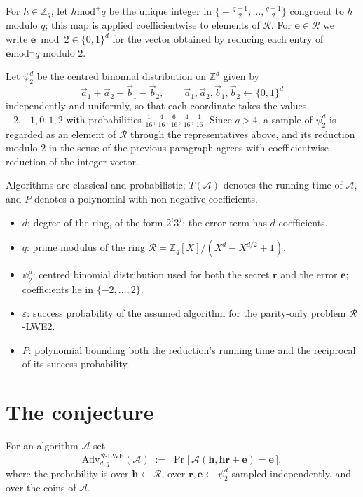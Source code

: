 \documentclass{aicr-conjecture}
\newcommand{\modpm}{\mathbin{\mathrm{mod}^{\pm}}}
\newcommand{\advlwe}{\mathrm{Adv}^{\mathcal{R}\text{-}\mathrm{LWE}}_{d,q}}
\begin{document}
For $h \in \mathbb{Z}_q$, let $h \modpm q$ be the unique integer in
$\bigl\{-\tfrac{q-1}{2},\dots,\tfrac{q-1}{2}\bigr\}$ congruent to $h$
modulo $q$; this map is applied coefficientwise to elements of
$\mathcal{R}$. For $\mathbf{e} \in \mathcal{R}$ we write
$\mathbf{e} \bmod 2 \in \{0,1\}^{d}$ for the vector obtained by
reducing each entry of $\mathbf{e} \modpm q$ modulo $2$.

Let $\psi_2^{d}$ be the centred binomial distribution on
$\mathbb{Z}^{d}$ given by
\[
  \vec{a}_1 + \vec{a}_2 - \vec{b}_1 - \vec{b}_2, \qquad
  \vec{a}_1,\vec{a}_2,\vec{b}_1,\vec{b}_2 \leftarrow \{0,1\}^{d}
\]
independently and uniformly, so that each coordinate takes the values
$-2,-1,0,1,2$ with probabilities
$\tfrac{1}{16},\tfrac{4}{16},\tfrac{6}{16},\tfrac{4}{16},\tfrac{1}{16}$.
Since $q > 4$, a sample of $\psi_2^{d}$ is regarded as an element of
$\mathcal{R}$ through the representatives above, and its reduction
modulo $2$ in the sense of the previous paragraph agrees with
coefficientwise reduction of the integer vector.

Algorithms are classical and probabilistic; $T(\mathcal{A})$ denotes
the running time of $\mathcal{A}$, and $P$ denotes a polynomial with
non-negative coefficients.

\begin{itemize}
\item $d$: degree of the ring, of the form $2^{i}3^{j}$; the error term
  has $d$ coefficients.
\item $q$: prime modulus of the ring
  $\mathcal{R} = \mathbb{Z}_q[X]/(X^{d}-X^{d/2}+1)$.
\item $\psi_2^{d}$: centred binomial distribution used for both the
  secret $\mathbf{r}$ and the error $\mathbf{e}$; coefficients lie in
  $\{-2,\dots,2\}$.
\item $\varepsilon$: success probability of the assumed algorithm for
  the parity-only problem $\mathcal{R}$-LWE2.
\item $P$: polynomial bounding both the reduction's running time and
  the reciprocal of its success probability.
\end{itemize}

\section{The conjecture}\label{sec:conjectures}

\begin{definition}\label{def:rlwe}
For an algorithm $\mathcal{A}$ set
\[
  \advlwe(\mathcal{A})
  \;:=\;
  \Pr\bigl[\,\mathcal{A}(\mathbf{h}, \mathbf{h}\mathbf{r} + \mathbf{e})
  = \mathbf{e}\,\bigr],
\]
where the probability is over $\mathbf{h} \leftarrow \mathcal{R}$, over
$\mathbf{r}, \mathbf{e} \leftarrow \psi_2^{d}$ sampled independently,
and over the coins of $\mathcal{A}$.
\end{definition}
\end{document}
